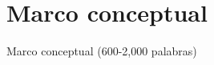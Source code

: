\section{Marco conceptual}
\label{Marco_conceptual}

Marco conceptual (600-2,000 palabras)
\par
\lipsum